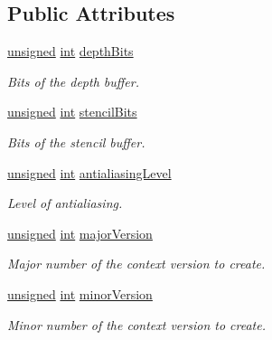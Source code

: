 \subsection*{Public Attributes}
\begin{DoxyCompactItemize}
\item 
\hyperlink{curses_8priv_8h_aca40206900cfc164654362fa8d4ad1e6}{unsigned} \hyperlink{term__entry_8h_ad65b480f8c8270356b45a9890f6499ae}{int} \hyperlink{structsf_1_1_context_settings_a4809e22089c2af7276b8809b5aede7bb}{depth\-Bits}
\begin{DoxyCompactList}\small\item\em Bits of the depth buffer. \end{DoxyCompactList}\item 
\hyperlink{curses_8priv_8h_aca40206900cfc164654362fa8d4ad1e6}{unsigned} \hyperlink{term__entry_8h_ad65b480f8c8270356b45a9890f6499ae}{int} \hyperlink{structsf_1_1_context_settings_ac2e788c201ca20e84fd38a28071abd29}{stencil\-Bits}
\begin{DoxyCompactList}\small\item\em Bits of the stencil buffer. \end{DoxyCompactList}\item 
\hyperlink{curses_8priv_8h_aca40206900cfc164654362fa8d4ad1e6}{unsigned} \hyperlink{term__entry_8h_ad65b480f8c8270356b45a9890f6499ae}{int} \hyperlink{structsf_1_1_context_settings_ac4a097be18994dba38d73f36b0418bdc}{antialiasing\-Level}
\begin{DoxyCompactList}\small\item\em Level of antialiasing. \end{DoxyCompactList}\item 
\hyperlink{curses_8priv_8h_aca40206900cfc164654362fa8d4ad1e6}{unsigned} \hyperlink{term__entry_8h_ad65b480f8c8270356b45a9890f6499ae}{int} \hyperlink{structsf_1_1_context_settings_a99a680d5c15a7e34c935654155dd5166}{major\-Version}
\begin{DoxyCompactList}\small\item\em Major number of the context version to create. \end{DoxyCompactList}\item 
\hyperlink{curses_8priv_8h_aca40206900cfc164654362fa8d4ad1e6}{unsigned} \hyperlink{term__entry_8h_ad65b480f8c8270356b45a9890f6499ae}{int} \hyperlink{structsf_1_1_context_settings_aaeb0efe9d2658b840da93b30554b100f}{minor\-Version}
\begin{DoxyCompactList}\small\item\em Minor number of the context version to create. \end{DoxyCompactList}\item 

\end{DoxyCompactItemize}

